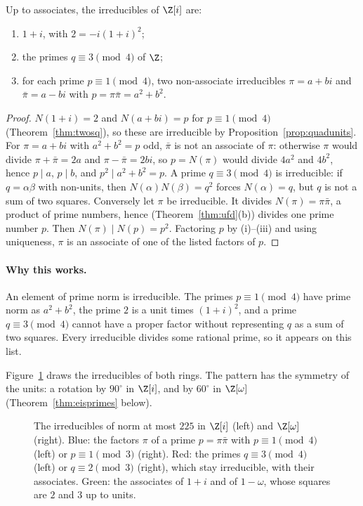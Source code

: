 \begin{theorem}\label{thm:gaussprimes}
Up to associates, the irreducibles of $\Z[i]$ are:
\begin{enumerate}[label=(\roman*)]
\item $1+i$, with $2=-i(1+i)^2$;
\item the primes $q\equiv3\pmod4$ of $\Z$;
\item for each prime $p\equiv1\pmod4$, two non-associate irreducibles $\pi=a+bi$ and $\bar\pi=a-bi$ with $p=\pi\bar\pi=a^2+b^2$.
\end{enumerate}
\end{theorem}
\begin{proof}
$N(1+i)=2$ and $N(a+bi)=p$ for $p\equiv1\pmod4$ (Theorem~\ref{thm:twosq}), so these are irreducible by Proposition~\ref{prop:quadunits}. For $\pi=a+bi$ with $a^2+b^2=p$ odd, $\bar\pi$ is not an associate of $\pi$: otherwise $\pi$ would divide $\pi+\bar\pi=2a$ and $\pi-\bar\pi=2bi$, so $p=N(\pi)$ would divide $4a^2$ and $4b^2$, hence $p\mid a$, $p\mid b$, and $p^2\mid a^2+b^2=p$. A prime $q\equiv3\pmod4$ is irreducible: if $q=\alpha\beta$ with non-units, then $N(\alpha)N(\beta)=q^2$ forces $N(\alpha)=q$, but $q$ is not a sum of two squares.
Conversely let $\pi$ be irreducible. It divides $N(\pi)=\pi\bar\pi$, a product of prime numbers, hence (Theorem~\ref{thm:ufd}(b)) divides one prime number $p$. Then $N(\pi)\mid N(p)=p^2$. Factoring $p$ by (i)--(iii) and using uniqueness, $\pi$ is an associate of one of the listed factors of $p$.
\end{proof}

\paragraph{Why this works.}
An element of prime norm is irreducible. The primes $p\equiv 1\pmod 4$ have prime norm as $a^2+b^2$, the prime $2$ is a unit times $(1+i)^2$, and a prime $q\equiv 3\pmod 4$ cannot have a proper factor without representing $q$ as a sum of two squares. Every irreducible divides some rational prime, so it appears on this list.

Figure~\ref{fig:gausseis} draws the irreducibles of both rings. The pattern has the symmetry of the units: a rotation by $90^\circ$ in $\Z[i]$, and by $60^\circ$ in $\Z[\omega]$ (Theorem~\ref{thm:eisprimes} below).

\begin{figure}[ht]
\centering
{}
\caption{The irreducibles of norm at most $225$ in $\Z[i]$ (left) and $\Z[\omega]$ (right). Blue: the factors $\pi$ of a prime $p=\pi\bar\pi$ with $p\equiv1\pmod4$ (left) or $p\equiv1\pmod3$ (right). Red: the primes $q\equiv3\pmod4$ (left) or $q\equiv2\pmod3$ (right), which stay irreducible, with their associates. Green: the associates of $1+i$ and of $1-\omega$, whose squares are $2$ and $3$ up to units.}
\label{fig:gausseis}
\end{figure}

